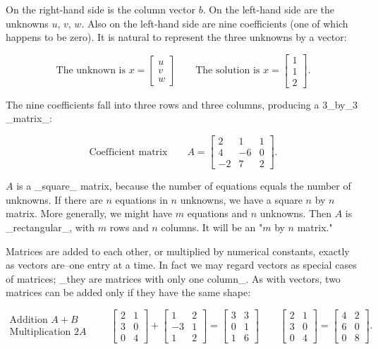 On the right-hand side is the column vector \(b\). On the left-hand side are the unknowns \(u\), \(v\), \(w\). Also on the left-hand side are nine coefficients (one of which happens to be zero). It is natural to represent the three unknowns by a vector:

\[\text{The unknown is }x=\begin{bmatrix}u\\ v\\ w\end{bmatrix}\qquad\text{The solution is }x=\begin{bmatrix}1\\ 1\\ 2\end{bmatrix}.\]

The nine coefficients fall into three rows and three columns, producing a \(3\)_by_\(3\)_matrix_:

\[\text{{Coefficient matrix}}\qquad A=\begin{bmatrix}2&1&1\\ 4&-6&0\\ -2&7&2\end{bmatrix}.\]

\(A\) is a _square_ matrix, because the number of equations equals the number of unknowns. If there are \(n\) equations in \(n\) unknowns, we have a square \(n\) by \(n\) matrix. More generally, we might have \(m\) equations and \(n\) unknowns. Then \(A\) is _rectangular_, with \(m\) rows and \(n\) columns. It will be an "\(m\) by \(n\) matrix."

Matrices are added to each other, or multiplied by numerical constants, exactly as vectors are--one entry at a time. In fact we may regard vectors as special cases of matrices; _they are matrices with only one column_. As with vectors, two matrices can be added only if they have the same shape:

\[\begin{array}{c}\text{{Addition }}A+B\\ \text{{Multiplication }}2A\end{array}\qquad\begin{bmatrix}2&1\\ 3&0\\ 0&4\end{bmatrix}+\begin{bmatrix}1&2\\ -3&1\\ 1&2\end{bmatrix}=\begin{bmatrix}3&3\\ 0&1\\ 1&6\end{bmatrix}\qquad\begin{bmatrix}2&1\\ 3&0\\ 0&4\end{bmatrix}=\begin{bmatrix}4&2\\ 6&0\\ 0&8\end{bmatrix}.\]

